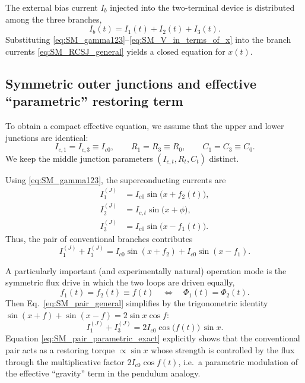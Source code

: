 \documentclass[prl,twocolumn,superscriptaddress,showpacs,nofootinbib]{revtex4-2}
\begin{document}
The external bias current $I_b$ injected into the two-terminal device is
distributed among the three branches,
\begin{equation}
I_b(t)=I_1(t)+I_2(t)+I_3(t).
\label{eq:SM_current_conservation}
\end{equation}
Substituting \eqref{eq:SM_gamma123}--\eqref{eq:SM_V_in_terms_of_x} into the
branch currents \eqref{eq:SM_RCSJ_general} yields a closed equation for $x(t)$.

\subsection{Symmetric outer junctions and effective ``parametric'' restoring term}
\label{sec:SM_parametric}
To obtain a compact effective equation, we assume that the upper and lower junctions are identical:
\begin{equation}
I_{c,1}=I_{c,3}\equiv I_{c0},
\qquad
R_1=R_3\equiv R_0,
\qquad
C_1=C_3\equiv C_0.
\label{eq:SM_identical_outer}
\end{equation}
We keep the middle junction parameters $(I_{c,t},R_t,C_t)$ distinct.

Using \eqref{eq:SM_gamma123}, the superconducting currents are
\begin{align}
I_1^{(J)} &= I_{c0}\sin\big(x+f_2(t)\big),
\\
I_2^{(J)} &= I_{c,t}\sin\big(x+\phi\big),
\\
I_3^{(J)} &= I_{c0}\sin\big(x-f_1(t)\big).
\end{align}
Thus, the pair of conventional branches contributes
\begin{equation}
I_1^{(J)}+I_3^{(J)}
=
I_{c0}\sin(x+f_2)+I_{c0}\sin(x-f_1).
\label{eq:SM_pair_general}
\end{equation}

A particularly important (and experimentally natural) operation mode is the symmetric flux drive in which the two loops are driven equally,
\begin{equation}
f_1(t)=f_2(t)\equiv f(t)
\quad \Longleftrightarrow \quad
\Phi_1(t)=\Phi_2(t).
\label{eq:SM_symmetric_drive}
\end{equation}
Then Eq.~\eqref{eq:SM_pair_general} simplifies by the trigonometric identity
$\sin(x+f)+\sin(x-f)=2\sin x\cos f$:
\begin{equation}
I_1^{(J)}+I_3^{(J)}
=
2I_{c0}\cos\big(f(t)\big)\,\sin x.
\label{eq:SM_pair_parametric_exact}
\end{equation}
Equation \eqref{eq:SM_pair_parametric_exact} explicitly shows that the
conventional pair acts as a restoring torque $\propto \sin x$ whose strength is controlled by the flux through the multiplicative factor $2I_{c0}\cos f(t)$, i.e.\ a parametric modulation of the effective ``gravity'' term in the pendulum analogy.
\end{document}
